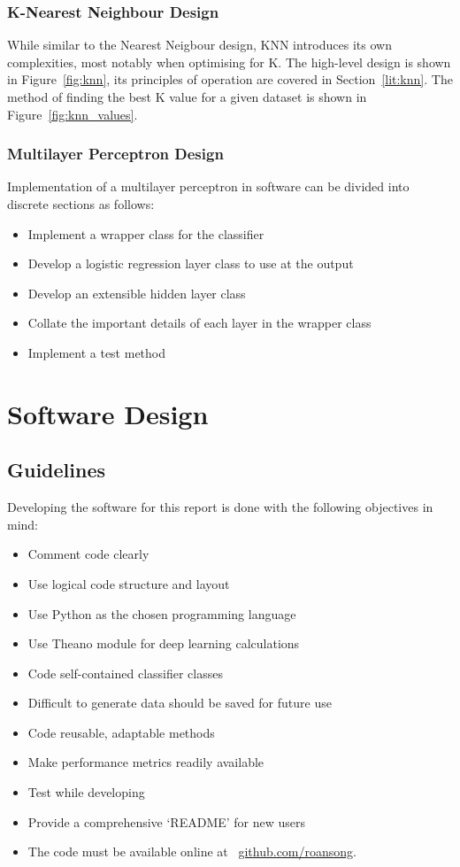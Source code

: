 \subsubsection{K-Nearest Neighbour Design}
While similar to the Nearest Neigbour design, 
KNN introduces its own complexities, most notably when optimising for K. The high-level design is shown in Figure~\ref{fig:knn}, its principles of operation are covered in Section~\ref{lit:knn}. The method of finding the best K value for a given dataset is shown in Figure~\ref{fig:knn_values}.

\subsubsection{Multilayer Perceptron Design}

Implementation of a multilayer perceptron in software can be divided into discrete sections as follows:
\begin{itemize}
	\item Implement a wrapper class for the classifier
	\item Develop a logistic regression layer class to use at the output
	\item Develop an extensible hidden layer class
	\item Collate the important details of each layer in the wrapper class
	\item Implement a test method
\end{itemize}

\section{Software Design}
\subsection{Guidelines}
Developing the software for this report is done with the following objectives in mind:
\begin{itemize}
	\item Comment code clearly
	\item Use logical code structure and layout
	\item Use Python as the chosen programming language
	\item Use Theano module for deep learning calculations
	\item Code self-contained classifier classes
	\item Difficult to generate data should be saved for future use
	\item Code reusable, adaptable methods
	\item Make performance metrics readily available
	\item Test while developing
	\item Provide a comprehensive `README' for new users
	\item The code must be available online at ~\href{http://github.com/roansong}{github.com/roansong}.
\end{itemize}

